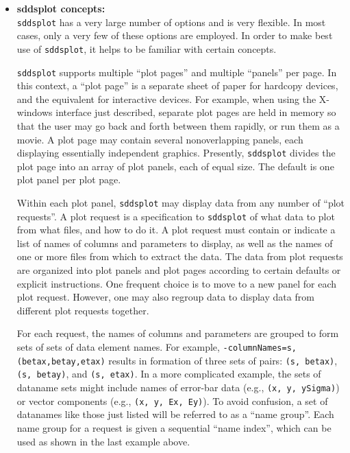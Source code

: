 \begin{itemize}
\begin{flushleft}{\tt
sddsplot -graphic=line,vary APS0.twi -columnNames=s,beta? -yScalesGroup=id=beta 
-columnNames=s,etax -yScalesGroup=id=eta
}
\end{flushleft}

\item {\bf sddsplot concepts:}\\

{\tt sddsplot} has a very large number of options and is very flexible.   In most cases, only a very few
of these options are employed.  In order to make best use of {\tt sddsplot}, it helps to be familiar with
certain concepts. 

{\tt sddsplot} supports multiple ``plot pages'' and multiple ``panels'' per page.  In this context, a
``plot page'' is a separate sheet of paper for hardcopy devices, and the equivalent for interactive
devices.  For example, when using the X-windows interface just described, separate plot pages are held in
memory so that the user may go back and forth between them rapidly, or run them as a movie.  A plot page
may contain several nonoverlapping panels, each displaying essentially independent graphics.  Presently,
{\tt sddsplot} divides the plot page into an array of plot panels, each of equal size.  The default is one
plot panel per plot page.

Within each plot panel, {\tt sddsplot} may display data from any number of ``plot requests''.  A plot
request is a specification to {\tt sddsplot} of what data to plot from what files, and how to do it.  A plot
request must contain or indicate a list of names of columns and parameters to display, as well as the names
of one or more files from which to extract the data.  The data from plot requests are organized into plot
panels and plot pages according to certain defaults or explicit instructions.  One frequent choice is to
move to a new panel for each plot request.  However, one may also regroup data to display data from
different plot requests together.

For each request, the names of columns and parameters are grouped to form sets of sets of data
element names.  For example, {\tt -columnNames=s,(betax,betay,etax)} results in formation of three
sets of pairs: {\tt (s, betax)}, {\tt (s, betay)}, and {\tt (s, etax)}.  In a more complicated
example, the sets of dataname sets might include names of error-bar data (e.g., {\tt (x, y, ySigma)})
or vector components (e.g., {\tt (x, y, Ex, Ey)}).  To avoid confusion, a set of datanames like those
just listed will be referred to as a ``name group''.  Each name group for a request is given a
sequential ``name index'', which can be used as shown in the last example above.


\end{itemize}
